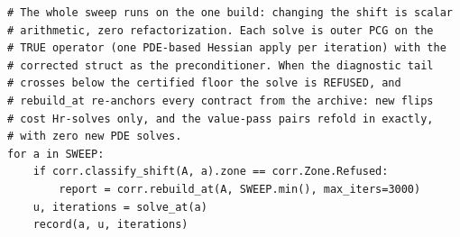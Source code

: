 \begin{verbatim}
# The whole sweep runs on the one build: changing the shift is scalar
# arithmetic, zero refactorization. Each solve is outer PCG on the
# TRUE operator (one PDE-based Hessian apply per iteration) with the
# corrected struct as the preconditioner. When the diagnostic tail
# crosses below the certified floor the solve is REFUSED, and
# rebuild_at re-anchors every contract from the archive: new flips
# cost Hr-solves only, and the value-pass pairs refold in exactly,
# with zero new PDE solves.
for a in SWEEP:
    if corr.classify_shift(A, a).zone == corr.Zone.Refused:
        report = corr.rebuild_at(A, SWEEP.min(), max_iters=3000)
    u, iterations = solve_at(a)
    record(a, u, iterations)
\end{verbatim}
